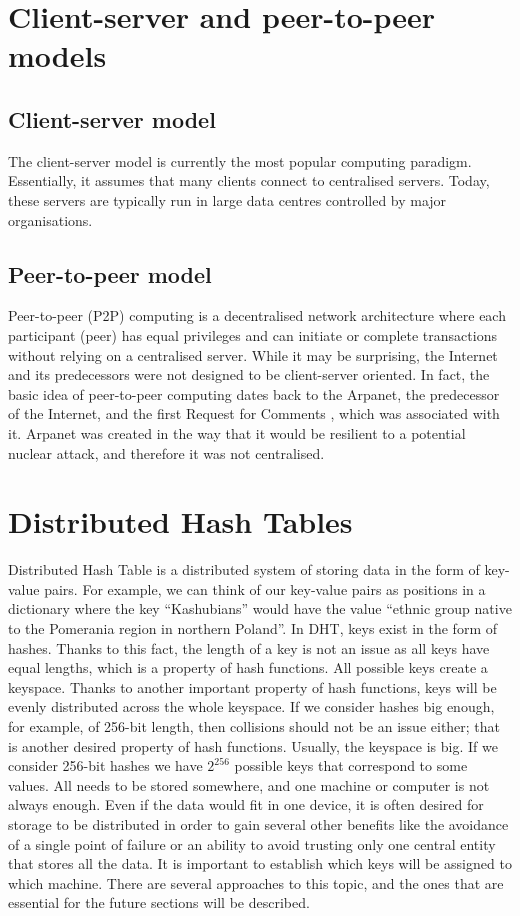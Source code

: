 \section{Client-server and peer-to-peer models}

\subsection{Client-server model}
The client-server model is currently the most popular computing paradigm. Essentially, it assumes that many clients connect to centralised servers. Today, these servers are typically run in large data centres controlled by major organisations.

\subsection{Peer-to-peer model}
Peer-to-peer (P2P) computing is a decentralised network architecture where each participant (peer) has equal privileges and can initiate or complete transactions without relying on a centralised server. While it may be surprising, the Internet and its predecessors were not designed to be client-server oriented. In fact, the basic idea of peer-to-peer computing dates back to the Arpanet, the predecessor of the Internet, and the first Request for Comments \cite{rfc1}, which was associated with it. Arpanet was created in the way that it would be resilient to a potential nuclear attack, and therefore it was not centralised.


\section{Distributed Hash Tables}
Distributed Hash Table is a distributed system of storing data in the form of key-value pairs. For example, we can think of our key-value pairs as positions in a dictionary where the key “Kashubians” would have the value “ethnic group native to the Pomerania region in northern Poland”. In DHT, keys exist in the form of hashes. Thanks to this fact, the length of a key is not an issue as all keys have equal lengths, which is a property of hash functions. All possible keys create a keyspace. Thanks to another important property of hash functions, keys will be evenly distributed across the whole keyspace. If we consider hashes big enough, for example, of 256-bit length, then collisions should not be an issue either; that is another desired property of hash functions.
Usually, the keyspace is big. If we consider 256-bit hashes we have $2^{256}$ possible keys that correspond to some values. All needs to be stored somewhere, and one machine or computer is not always enough. Even if the data would fit in one device, it is often desired for storage to be distributed in order to gain several other benefits like the avoidance of a single point of failure or an ability to avoid trusting only one central entity that stores all the data. 
It is important to establish which keys will be assigned to which machine. There are several approaches to this topic, and the ones that are essential for the future sections will be described.

